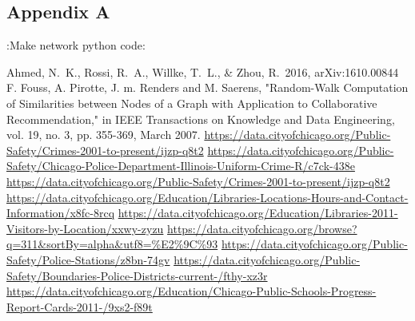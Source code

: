 \documentclass{article}
\begin{document}
\begin{appendices}
 \chapter{Appendix A}
 \label{appendix:a}
 :Make network python code: 
 
\end{appendices}
\newpage
\begin{thebibliography}{9}

 Ahmed, N.~K., Rossi, R.~A., Willke, T.~L., \& Zhou, R.\ 2016, arXiv:1610.00844 
 F. Fouss, A. Pirotte, J. m. Renders and M. Saerens, "Random-Walk Computation of Similarities between Nodes of a Graph with Application to Collaborative Recommendation," in IEEE Transactions on Knowledge and Data Engineering, vol. 19, no. 3, pp. 355-369, March 2007.
 \url{https://data.cityofchicago.org/Public-Safety/Crimes-2001-to-present/ijzp-q8t2}
 \url{https://data.cityofchicago.org/Public-Safety/Chicago-Police-Department-Illinois-Uniform-Crime-R/c7ck-438e}
 \url{https://data.cityofchicago.org/Public-Safety/Crimes-2001-to-present/ijzp-q8t2}
\url{https://data.cityofchicago.org/Education/Libraries-Locations-Hours-and-Contact-Information/x8fc-8rcq}
 \url{https://data.cityofchicago.org/Education/Libraries-2011-Visitors-by-Location/xxwy-zyzu}
 \url{https://data.cityofchicago.org/browse?q=311&sortBy=alpha&utf8=\%E2\%9C\%93}
 \url{https://data.cityofchicago.org/Public-Safety/Police-Stations/z8bn-74gv}
 \url{https://data.cityofchicago.org/Public-Safety/Boundaries-Police-Districts-current-/fthy-xz3r}
 \url{https://data.cityofchicago.org/Education/Chicago-Public-Schools-Progress-Report-Cards-2011-/9xs2-f89t}
\end{thebibliography}
\end{document}
